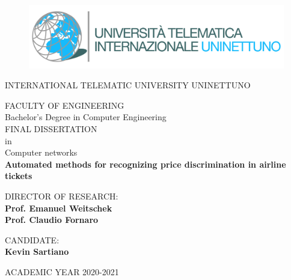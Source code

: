 \thispagestyle{empty}


\begin{figure}
    \centering
    \includegraphics[scale=.75]{images/logo_uninettuno}\label{fig:logo}\vspace*{5mm}
\end{figure}

\begin{center}

    \LARGE{INTERNATIONAL TELEMATIC UNIVERSITY UNINETTUNO}\vspace{15mm}

    \Large{FACULTY OF ENGINEERING}\\
    \Large{Bachelor's Degree in Computer Engineering}\vspace{15mm}\\

    \Large{FINAL DISSERTATION}\\
    \Large{in}\\
    \Large{Computer networks}\vspace{15mm}\\

    \LARGE{\textbf{Automated methods for recognizing price discrimination in airline tickets}}

\end{center}

\vspace{20mm}

\begin{multicols}{2}
    \begin{flushleft}
        \large{DIRECTOR OF RESEARCH:}\\
        \large{\textbf{Prof. Emanuel Weitschek}}\\
        \large{\textbf{Prof. Claudio Fornaro}}
    \end{flushleft}
    \begin{flushright}
        \large{CANDIDATE:}\\
        \large{\textbf{Kevin Sartiano}}\\
    \end{flushright}
\end{multicols}

\vspace{1mm}

\begin{center}
    ACADEMIC YEAR 2020-2021
\end{center}

\newpage